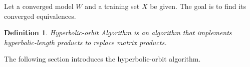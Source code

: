\documentclass{article}
\theoremstyle{plain}
\theoremstyle{plain} %
\newtheorem{definition}[theorem]{Definition}
\theoremstyle{definition}  %
\theoremstyle{remark}  %
\theoremstyle{plain}
\begin{document}
Let a converged model $W$ and a training set $X$ be given. The goal is to find its converged equivalences.

\begin{definition}
Hyperbolic-orbit Algorithm is an algorithm that implements hyperbolic-length products to replace matrix products.
\end{definition}
The following section introduces the hyperbolic-orbit algorithm.




\end{document}
